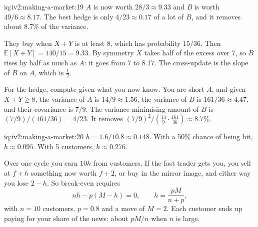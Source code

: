 \begin{solution}{iq:iv2:making-a-market:19}
$A$ is now worth $28/3 \approx 9.33$ and $B$ is worth $49/6 \approx 8.17$. The best hedge is only $4/23 \approx 0.17$ of a lot of $B$, and it removes about 8.7\% of the variance.

They buy when $X + Y$ is at least 8, which has probability $15/36$. Then $\mathbb{E}[X + Y] = 140/15 = 9.33$. By symmetry $X$ takes half of the excess over 7, so $B$ rises by half as much as $A$: it goes from 7 to 8.17. The cross-update is the slope of $B$ on $A$, which is $\tfrac12$.

For the hedge, compute given what you now know. You are short $A$, and given $X + Y \ge 8$, the variance of $A$ is $14/9 \approx 1.56$, the variance of $B$ is $161/36 \approx 4.47$, and their covariance is $7/9$. The variance-minimising amount of $B$ is $(7/9)/(161/36) = 4/23$. It removes $(7/9)^2/\left(\tfrac{14}{9} \cdot \tfrac{161}{36}\right) \approx 8.7\%$.

\end{solution}

\begin{solution}{iq:iv2:making-a-market:20}
$h = 1.6/10.8 \approx 0.148$. With a 50\% chance of being hit, $h \approx 0.095$. With 5 customers, $h \approx 0.276$.

Over one cycle you earn $10h$ from customers. If the fast trader gets you, you sell at $f + h$ something now worth $f + 2$, or buy in the mirror image, and either way you lose $2 - h$. So break-even requires
\[
n h - p (M - h) = 0, \qquad h = \frac{p M}{n + p},
\]
with $n = 10$ customers, $p = 0.8$ and a move of $M = 2$. Each customer ends up paying for your share of the news: about $pM/n$ when $n$ is large.

\end{solution}

